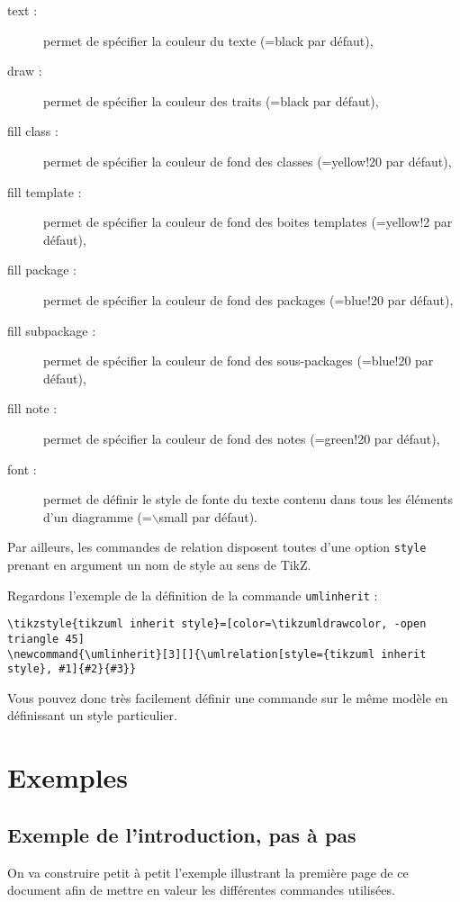 \documentclass[a4paper,11pt]{report}
\newcommand{\TikZ}{{\sc TikZ}}
\begin{document}
\begin{description}
\item[text : ] permet de spécifier la couleur du texte (=black par défaut),
\item[draw :] permet de spécifier la couleur des traits (=black par défaut),
\item[fill class :] permet de spécifier la couleur de fond des classes (=yellow!20 par défaut),
\item[fill template :] permet de spécifier la couleur de fond des boites templates (=yellow!2 par défaut),
\item[fill package :] permet de spécifier la couleur de fond des packages (=blue!20 par défaut),
\item[fill subpackage :] permet de spécifier la couleur de fond des sous-packages (=blue!20 par défaut),
\item[fill note :] permet de spécifier la couleur de fond des notes (=green!20 par défaut),
\item[font :] permet de définir le style de fonte du texte contenu dans tous les éléments d'un diagramme (=$\backslash$small par défaut).
\end{description}

Par ailleurs, les commandes de relation disposent toutes d'une option {\tt style} prenant en argument un nom de style au sens de \TikZ.

Regardons l'exemple de la définition de la commande {\tt umlinherit} :

\begin{lstlisting}
\tikzstyle{tikzuml inherit style}=[color=\tikzumldrawcolor, -open triangle 45]
\newcommand{\umlinherit}[3][]{\umlrelation[style={tikzuml inherit style}, #1]{#2}{#3}}
\end{lstlisting}

Vous pouvez donc très facilement définir une commande sur le même modèle en définissant un style particulier.

\section{Exemples}

\subsection{Exemple de l'introduction, pas à pas}

On va construire petit à petit l'exemple illustrant la première page de ce document afin de mettre en valeur les différentes commandes utilisées.
\end{document}
